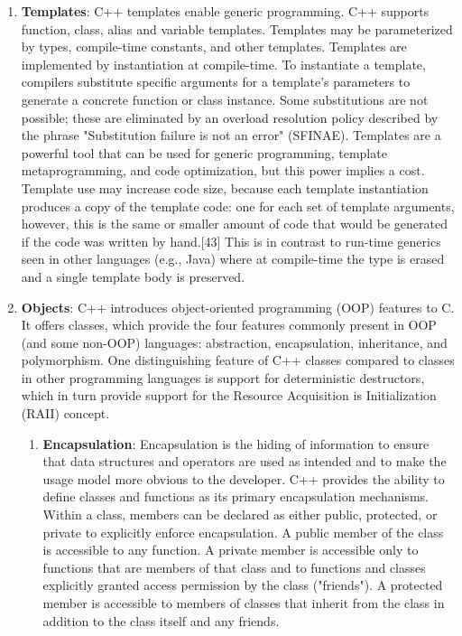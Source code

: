 \begin{enumerate}
	\item \textbf{Templates}: C++ templates enable generic programming. C++ supports function, class, alias and variable templates. Templates may be parameterized by types, compile-time constants, and other templates. Templates are implemented by instantiation at compile-time. To instantiate a template, compilers substitute specific arguments for a template's parameters to generate a concrete function or class instance. Some substitutions are not possible; these are eliminated by an overload resolution policy described by the phrase "Substitution failure is not an error" (SFINAE). Templates are a powerful tool that can be used for generic programming, template metaprogramming, and code optimization, but this power implies a cost. Template use may increase code size, because each template instantiation produces a copy of the template code: one for each set of template arguments, however, this is the same or smaller amount of code that would be generated if the code was written by hand.[43] This is in contrast to run-time generics seen in other languages (e.g., Java) where at compile-time the type is erased and a single template body is preserved.\\
	\item \textbf{Objects}: C++ introduces object-oriented programming (OOP) features to C. It offers classes, which provide the four features commonly present in OOP (and some non-OOP) languages: abstraction, encapsulation, inheritance, and polymorphism. One distinguishing feature of C++ classes compared to classes in other programming languages is support for deterministic destructors, which in turn provide support for the Resource Acquisition is Initialization (RAII) concept.
	\begin{enumerate}
		\item \textbf{Encapsulation}: Encapsulation is the hiding of information to ensure that data structures and operators are used as intended and to make the usage model more obvious to the developer. C++ provides the ability to define classes and functions as its primary encapsulation mechanisms. Within a class, members can be declared as either public, protected, or private to explicitly enforce encapsulation. A public member of the class is accessible to any function. A private member is accessible only to functions that are members of that class and to functions and classes explicitly granted access permission by the class ("friends"). A protected member is accessible to members of classes that inherit from the class in addition to the class itself and any friends.\\

\end{enumerate}
\end{enumerate}
